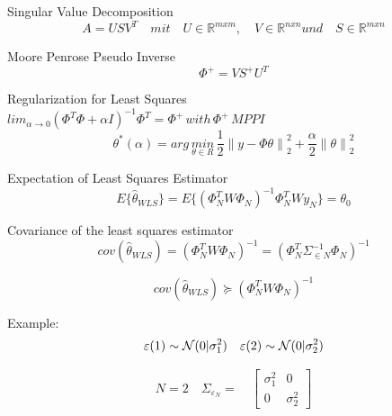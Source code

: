 Singular Value Decomposition
\begin{equation*}
A=US{ V }^{ T }\quad mit\quad U\in\mathbb{{R}}^{mxm}, \quad V\in\mathbb{{R}}^{nxn} und \quad S\in\mathbb{{R}}^{mxn}
\end{equation*}

Moore Penrose Pseudo Inverse
\begin{equation*}
{ \Phi  }^{ + }=V{ S }^{+}{U}^{T}
\end{equation*}

Regularization for Least Squares\\
\( { lim }_{ \alpha \rightarrow 0 }{ ({ \Phi  }^{ T }\Phi +\alpha { I }) }^{ -1 }{ \Phi  }^{ T }={ \Phi  }^{ + }\, with\,{ \Phi  }^{ + }\, MPPI \)
\begin{equation*}
{ \theta  }^{ * }(\alpha )=arg\, \underset { \theta \in { R } }{ min } \, \frac { 1 }{ 2 } {\parallel y-\Phi\theta \parallel}_{2}^{2}+\frac { \alpha }{ 2 } {\parallel \theta\parallel}_{2}^{2}
\end{equation*}

Expectation of Least Squares Estimator
\begin{equation*}
{ E }\{ { \hat { \theta  } _{ WLS } }\} { ={ E }\{ ({ \Phi  }_{ N }^{ T }W{ \Phi  }_{ N }) }^{ -1 }{ \Phi  }_{ N }^{ T }W{ y }_{ N }\} ={\theta}_{0}
\end{equation*}


Covariance of the least squares estimator
\begin{equation*}
cov({ \hat { \theta  } _{ WLS } }){ =({ \Phi  }_{ N }^{ T }W{ \Phi  }_{ N }) }^{ -1 }{ =({ \Phi  }_{ N }^{ T }{\Sigma}_{\in N }^{ -1 }{ \Phi  }_{ N }) }^{ -1 }
\end{equation*}

\begin{equation*}
cov({ \hat { \theta  } _{ WLS } }){ \succeq ({ \Phi  }_{ N }^{ T }W{ \Phi  }_{ N }) }^{ -1 }
\end{equation*}


Example:
\begin{equation*}
\varepsilon (1) \sim  { \cal{N} }(0|\sigma ^{ 2 }_{ 1 }) \quad \varepsilon (2) \sim  { \cal{N} }(0|\sigma ^{ 2 }_{ 2 })
\end{equation*}

\begin{equation*}
N=2 \quad { \Sigma  }_{ { \varepsilon  }_{ N } }=\quad \begin{bmatrix} \sigma _{ 1 }^{ 2 } & 0 \\ 0 & \sigma _{ 2 }^{ 2 } \end{bmatrix}
\end{equation*}

